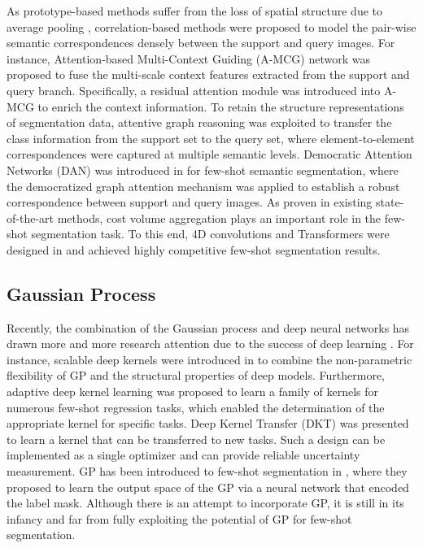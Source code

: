 \documentclass[runningheads]{llncs}
\begin{document}
As prototype-based methods suffer from the loss of spatial structure due to average pooling \cite{zhang2020sg}, correlation-based methods were proposed to model the pair-wise semantic correspondences densely between the support and query images. For instance, Attention-based Multi-Context Guiding (A-MCG) network \cite{hu2019attention} was proposed to fuse the multi-scale context features extracted from the support and query branch. Specifically, a residual attention module was introduced into A-MCG to enrich the context information. To retain the structure representations of segmentation data, attentive graph reasoning \cite{zhang2019pyramid} was exploited to transfer the class information from the support set to the query set, where element-to-element correspondences were captured at multiple semantic levels. Democratic Attention Networks (DAN) was introduced in \cite{wang2020few} for few-shot semantic segmentation, where the democratized graph attention mechanism was applied to establish a robust correspondence between support and query images. As proven in existing state-of-the-art methods, cost volume aggregation plays an important role in the few-shot segmentation task. To this end, 4D convolutions and Transformers were designed in \cite{min2021hypercorrelation,hong2021cost} and achieved highly competitive few-shot segmentation results.

\subsection{Gaussian Process}
Recently, the combination of the Gaussian process and deep neural networks has drawn more and more research attention due to the success of deep learning \cite{tossou2019adaptive,snell2020bayesian,patacchiola2020bayesian,wilson2016deep}. For instance, scalable deep kernels were introduced in \cite{wilson2016deep} to combine the non-parametric flexibility of GP and the structural properties of deep models. Furthermore, adaptive deep kernel learning \cite{tossou2019adaptive} was proposed to learn a family of kernels for numerous few-shot regression tasks, which enabled the determination of the appropriate kernel for specific tasks. Deep Kernel Transfer (DKT) \cite{patacchiola2020bayesian} was presented to learn a kernel that can be transferred to new tasks. Such a design can be implemented as a single optimizer and can provide reliable uncertainty measurement. GP has been introduced to few-shot segmentation in \cite{johnander2021dense}, where they proposed to learn the output space of the GP via a neural network that encoded the label mask. Although there is an attempt to incorporate GP, it is still in its infancy and far from fully exploiting the potential of GP for few-shot segmentation.
\end{document}
